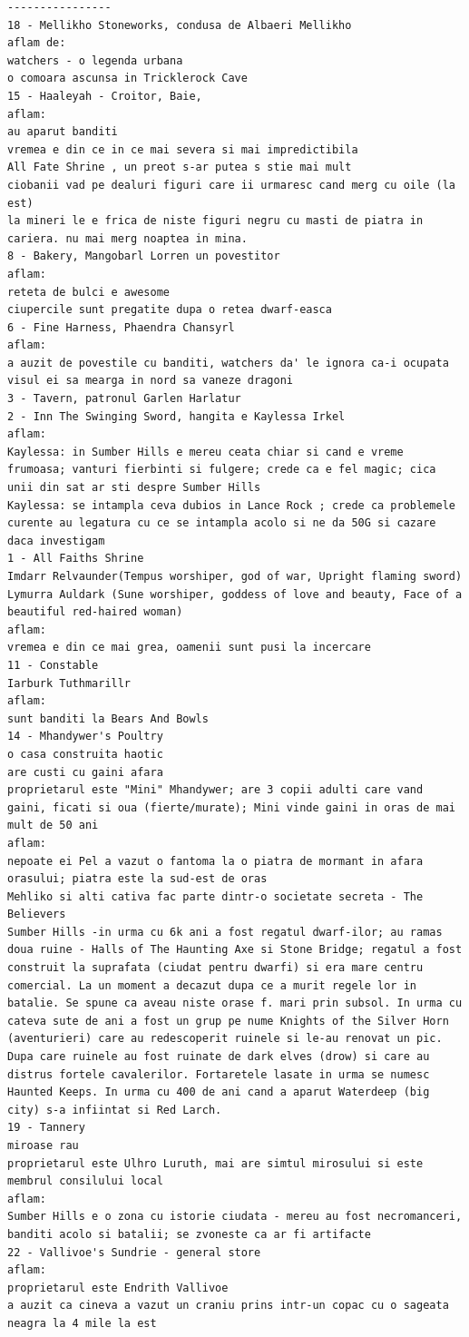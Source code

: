 \documentclass[12pt,twoside]{book}
\begin{document}
\begin{verbatim}
----------------
18 - Mellikho Stoneworks, condusa de Albaeri Mellikho
aflam de:
watchers - o legenda urbana
o comoara ascunsa in Tricklerock Cave
15 - Haaleyah - Croitor, Baie, 
aflam:
au aparut banditi
vremea e din ce in ce mai severa si mai impredictibila
All Fate Shrine , un preot s-ar putea s stie mai mult
ciobanii vad pe dealuri figuri care ii urmaresc cand merg cu oile (la est)
la mineri le e frica de niste figuri negru cu masti de piatra in cariera. nu mai merg noaptea in mina.
8 - Bakery, Mangobarl Lorren un povestitor
aflam:
reteta de bulci e awesome
ciupercile sunt pregatite dupa o retea dwarf-easca
6 - Fine Harness, Phaendra Chansyrl
aflam:
a auzit de povestile cu banditi, watchers da' le ignora ca-i ocupata
visul ei sa mearga in nord sa vaneze dragoni
3 - Tavern, patronul Garlen Harlatur
2 - Inn The Swinging Sword, hangita e Kaylessa Irkel
aflam:
Kaylessa: in Sumber Hills e mereu ceata chiar si cand e vreme frumoasa; vanturi fierbinti si fulgere; crede ca e fel magic; cica unii din sat ar sti despre Sumber Hills
Kaylessa: se intampla ceva dubios in Lance Rock ; crede ca problemele curente au legatura cu ce se intampla acolo si ne da 50G si cazare daca investigam
1 - All Faiths Shrine
Imdarr Relvaunder(Tempus worshiper, god of war, Upright flaming sword)
Lymurra Auldark (Sune worshiper, goddess of love and beauty, Face of a beautiful red-haired woman)
aflam:
vremea e din ce mai grea, oamenii sunt pusi la incercare
11 - Constable
Iarburk Tuthmarillr
aflam:
sunt banditi la Bears And Bowls
14 - Mhandywer's Poultry
o casa construita haotic
are custi cu gaini afara
proprietarul este "Mini" Mhandywer; are 3 copii adulti care vand gaini, ficati si oua (fierte/murate); Mini vinde gaini in oras de mai mult de 50 ani
aflam:
nepoate ei Pel a vazut o fantoma la o piatra de mormant in afara orasului; piatra este la sud-est de oras
Mehliko si alti cativa fac parte dintr-o societate secreta - The Believers
Sumber Hills -in urma cu 6k ani a fost regatul dwarf-ilor; au ramas doua ruine - Halls of The Haunting Axe si Stone Bridge; regatul a fost construit la suprafata (ciudat pentru dwarfi) si era mare centru comercial. La un moment a decazut dupa ce a murit regele lor in batalie. Se spune ca aveau niste orase f. mari prin subsol. In urma cu cateva sute de ani a fost un grup pe nume Knights of the Silver Horn (aventurieri) care au redescoperit ruinele si le-au renovat un pic. Dupa care ruinele au fost ruinate de dark elves (drow) si care au distrus fortele cavalerilor. Fortaretele lasate in urma se numesc Haunted Keeps. In urma cu 400 de ani cand a aparut Waterdeep (big city) s-a infiintat si Red Larch.
19 - Tannery
miroase rau
proprietarul este Ulhro Luruth, mai are simtul mirosului si este membrul consilului local
aflam:
Sumber Hills e o zona cu istorie ciudata - mereu au fost necromanceri, banditi acolo si batalii; se zvoneste ca ar fi artifacte
22 - Vallivoe's Sundrie - general store
aflam:
proprietarul este Endrith Vallivoe
a auzit ca cineva a vazut un craniu prins intr-un copac cu o sageata neagra la 4 mile la est


\end{verbatim}
\end{document}
